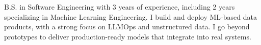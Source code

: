 

\begin{cvparagraph}

  B.S. in Software Engineering with 3 years of experience, including 2 years specializing in Machine Learning Engineering. I build and deploy ML-based data products, with a strong focus on LLMOps and unstructured data. I go beyond prototypes to deliver production-ready models that integrate into real systems.
\end{cvparagraph}
